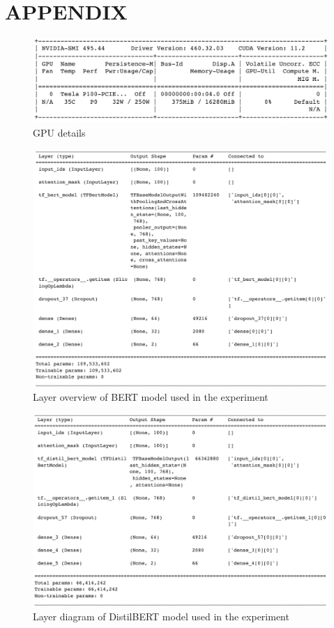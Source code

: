 \documentclass[%
	BCOR=8mm, %
	DIV=12,
	toc=bibliography, %
	toc=listof, %
	oneside, %
	egregdoesnotlikesansseriftitles, %
	]{scrbook}
\begin{document}
\chapter{APPENDIX}
\label{chapter:appendix}
\begin{figure}[H]
    \centering
    \includegraphics[width=0.9\linewidth]{img/nvidiagpu}
    \caption[Details of GPU]{GPU details}
    \label{fig:nvidiagpu}
\end{figure}
\begin{figure}[H]
    \centering
    \includegraphics[width=0.8\linewidth]{img/bert_arch}
    \caption[ Layer diagram of BERT model used in the experiment]{Layer overview of BERT model used in the experiment}
    \label{fig:bertarch}
\end{figure}
\begin{figure}[H]
    \centering
    \includegraphics[width=0.8\linewidth]{img/DistilBERTarch}
    \caption[Layer diagram of DistilBERT model used in the experiment]{Layer diagram of DistilBERT model used in the experiment}
    \label{fig:distilbertarch}
\end{figure}
\end{document}

